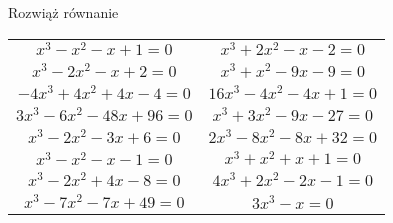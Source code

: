 \documentclass[a4paper,12pt,leqno,fleqn]{article}
\begin{document}
\newpage
Rozwiąż równanie

\begin{tabularx}{\linewidth}{@{}XX@{}}

  \begin{equation}
    x^3-x^2-x+1=0
  \end{equation}
&
  \begin{equation}
    x^3+2x^2-x-2=0
  \end{equation}
\\
  \begin{equation}
    x^3-2x^2-x+2=0
  \end{equation}
&
  \begin{equation}
    x^3+x^2-9x-9=0
  \end{equation}
\\
  \begin{equation}
    -4x^3+4x^2+4x-4=0
  \end{equation}
&
  \begin{equation}
    16x^3-4x^2-4x+1=0
  \end{equation}
\\
  \begin{equation}
    3x^3-6x^2-48x+96=0
  \end{equation}
&
  \begin{equation}
    x^3+3x^2-9x-27=0
  \end{equation}
\\
  \begin{equation}
    x^3-2x^2-3x+6=0
  \end{equation}
&
  \begin{equation}
    2x^3-8x^2-8x+32=0
  \end{equation}
\\
  \begin{equation}
    x^3-x^2-x-1=0
  \end{equation}
&
  \begin{equation}
    x^3+x^2+x+1=0
  \end{equation}
\\
  \begin{equation}
    x^3-2x^2+4x-8=0
  \end{equation}
&
  \begin{equation}
    4x^3+2x^2-2x-1=0
  \end{equation}
\\
  \begin{equation}
    x^3-7x^2-7x+49=0
  \end{equation}
&
  \begin{equation}
    3x^3-x=0
  \end{equation}

\end{tabularx}
\end{document}

